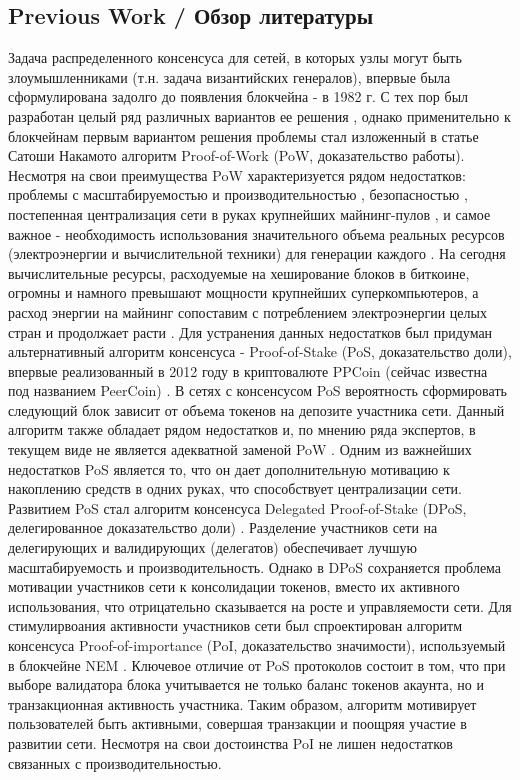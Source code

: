 \documentclass[a4paper,12pt]{article}
\begin{document}
\subsection{Previous Work / Обзор литературы}
Задача распределенного консенсуса для сетей, в которых узлы могут быть злоумышленниками (т.н. задача византийских генералов), впервые была сформулирована задолго до появления блокчейна - в 1982 г. \cite{Lamport} С тех пор был разработан целый ряд различных вариантов ее решения \cite{Castro}, однако применительно к блокчейнам первым вариантом решения проблемы стал изложенный в статье Сатоши Накамото \cite{satoshi} алгоритм Proof-of-Work (PoW, доказательство работы). Несмотря на свои преимущества PoW характеризуется рядом недостатков: проблемы с масштабируемостью и производительностью \cite{Croman}, безопасностью \cite{Eyal}, постепенная централизация сети в руках крупнейших майнинг-пулов \cite{Buterin}, и самое важное - необходимость использования значительного объема реальных ресурсов (электроэнергии и вычислительной техники) для генерации каждого \cite{Bentov}. На сегодня вычислительные ресурсы, расходуемые на хеширование блоков в биткоине, огромны и намного превышают мощности крупнейших суперкомпьютеров, а расход энергии на майнинг сопоставим с потреблением электроэнергии целых стран и продолжает расти \cite{energy}.
Для устранения данных недостатков был придуман альтернативный алгоритм консенсуса - Proof-of-Stake (PoS, доказательство доли), впервые реализованный в 2012 году в криптовалюте PPCoin (сейчас известна под названием PeerCoin) \cite{Ppcoin}. В сетях с консенсусом PoS вероятность сформировать следующий блок зависит от объема токенов на депозите участника сети. Данный алгоритм также обладает рядом недостатков и, по мнению ряда экспертов, в текущем виде не является адекватной заменой PoW \cite{Demeester} \cite{Poelstra}. Одним из важнейших недостатков PoS является то, что он дает дополнительную мотивацию к накоплению средств в одних руках, что способствует централизации сети.
Развитием PoS стал алгоритм консенсуса Delegated Proof-of-Stake (DPoS, делегированное доказательство доли) \cite{dantheman}. Разделение участников сети на делегирующих и валидирующих (делегатов) обеспечивает лучшую масштабируемость и производительность. Однако в DPoS сохраняется проблема мотивации участников сети к консолидации токенов, вместо их активного использования, что отрицательно сказывается на росте и управляемости сети.
Для стимулирвоания активности участников сети был спроектирован алгоритм консенсуса Proof-of-importance (PoI, доказательство значимости), используемый в блокчейне NEM \cite{nem}. Ключевое отличие от PoS протоколов состоит в том, что при выборе валидатора блока учитывается не только баланс токенов акаунта, но и транзакционная активность участника. Таким образом, алгоритм мотивирует пользователей быть активными, совершая транзакции и поощряя участие в развитии сети. Несмотря на свои достоинства PoI не лишен недостатков связанных с производительностью. 
\end{document}
